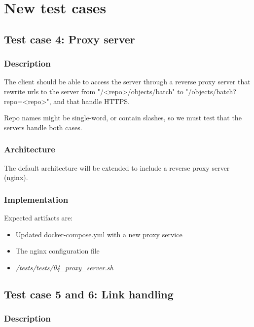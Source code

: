 \section{New test cases}

\subsection{Test case 4: Proxy server}

\subsubsection{Description}

The client should be able to access the server through a reverse proxy server that rewrite urls to the server from "/<repo>/objects/batch" to "/objects/batch?repo=<repo>", and that handle HTTPS. 

Repo names might be single-word, or contain slashes, so we must test that the servers handle both cases.

\subsubsection{Architecture}

The default architecture will be extended to include a reverse proxy server (nginx). 

\subsubsection{Implementation}

Expected artifacts are:

\begin{itemize}
    \item Updated docker-compose.yml with a new proxy service
    \item The nginx configuration file
    \item \textit{/tests/tests/04\_proxy\_server.sh}
\end{itemize}

\subsection{Test case 5 and 6: Link handling}

\subsubsection{Description}


